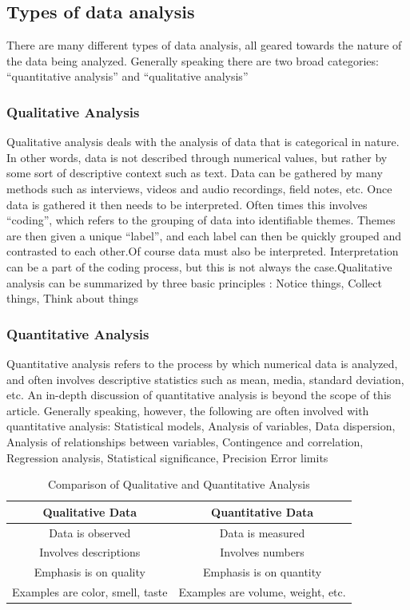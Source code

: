 \documentclass[a4paper,12pt,oneside]{report}
\begin{document}
{\subsection{Types of data analysis }
{     There are many different types of data analysis, all geared towards the nature of the data being analyzed. Generally speaking there are two broad categories: “quantitative analysis” and “qualitative analysis”}
\subsubsection{Qualitative Analysis}
{    Qualitative analysis deals with the analysis of data that is categorical in nature. In other words, data is not described through numerical values, but rather by some sort of descriptive context such as text. Data can be gathered by many methods such as interviews, videos and audio recordings, field notes, etc.
Once data is gathered it then needs to be interpreted. Often times this involves “coding”, which refers to the grouping of data into identifiable themes. Themes are then given a unique “label”, and each label can then be quickly grouped and contrasted to each other.Of course data must also be interpreted. Interpretation can be a part of the coding process, but this is not always the case.Qualitative analysis can be summarized by three basic principles :
Notice things, Collect things, Think about things}
\subsubsection{Quantitative Analysis}
{   Quantitative analysis refers to the process by which numerical data is analyzed, and often involves descriptive statistics such as mean, media, standard deviation, etc. An in-depth discussion of quantitative analysis is beyond the scope of this article. Generally speaking, however, the following are often involved with quantitative analysis:
Statistical models, Analysis of variables, Data dispersion, Analysis of relationships between variables, Contingence and correlation, Regression analysis, Statistical significance, Precision Error limits}
\begin{table}
\begin{center}
\begin{tabular}{|c|c|}
\hline
Qualitative Data & Quantitative Data\\
\hline
Data is observed  & Data is measured \\
\hline
Involves descriptions& Involves numbers \\
\hline
Emphasis is on quality&Emphasis is on quantity\\
\hline
Examples are color, smell, taste&Examples are volume, weight, etc.\\
\hline
\end{tabular}
\end{center}
\caption{Comparison of Qualitative and Quantitative Analysis}
\end{table}
}
\end{document}
